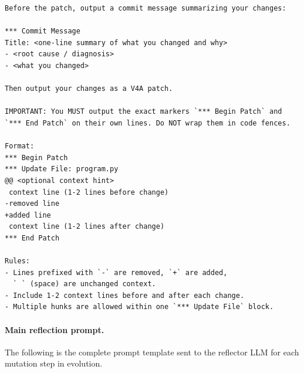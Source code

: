 \begin{lstlisting}[style=evolvedcode, basicstyle=\ttfamily\scriptsize]
Before the patch, output a commit message summarizing your changes:

*** Commit Message
Title: <one-line summary of what you changed and why>
- <root cause / diagnosis>
- <what you changed>

Then output your changes as a V4A patch.

IMPORTANT: You MUST output the exact markers `*** Begin Patch` and
`*** End Patch` on their own lines. Do NOT wrap them in code fences.

Format:
*** Begin Patch
*** Update File: program.py
@@ <optional context hint>
 context line (1-2 lines before change)
-removed line
+added line
 context line (1-2 lines after change)
*** End Patch

Rules:
- Lines prefixed with `-` are removed, `+` are added,
  ` ` (space) are unchanged context.
- Include 1-2 context lines before and after each change.
- Multiple hunks are allowed within one `*** Update File` block.
\end{lstlisting}

\paragraph{Main reflection prompt.}
The following is the complete prompt template sent to the reflector LLM for each mutation step in evolution.

